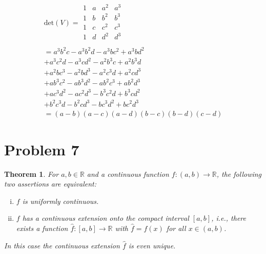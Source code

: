 \documentclass[]{article}
\newtheorem{theorem}{Theorem}
\begin{document}
\begin{align*}
	\textrm{det}(V) =
	\begin{array}{|cccc|}
		1 & a & a^2 & a^3 \\
		1 & b & b^2 & b^3 \\
		1 & c & c^2 & c^3 \\
		1 & d & d^2 & d^3 \\
	\end{array}
	\\ = a^{3} b^{2} c - a^{3} b^{2} d - a^{3} b c^{2} + a^{3} b d^{2} \\ + a^{3} c^{2} d - a^{3} c d^{2} - a^{2} b^{3} c + a^{2} b^{3} d \\ + a^{2} b c^{3} - a^{2} b d^{3} - a^{2} c^{3} d + a^{2} c d^{3} \\ + a b^{3} c^{2} - a b^{3} d^{2} - a b^{2} c^{3} + a b^{2} d^{3} \\ + a c^{3} d^{2} - a c^{2} d^{3} - b^{3} c^{2} d + b^{3} c d^{2} \\ + b^{2} c^{3} d - b^{2} c d^{3} - b c^{3} d^{2} + b c^{2} d^{3}
	\\ = \left(a - b\right) \left(a - c\right) \left(a - d\right) \left(b - c\right) \left(b - d\right) \left(c - d\right)
\end{align*}

\section*{Problem 7}

\begin{theorem}
	For $a,b \in \mathbb{R}$ and a continuous function $f : (a, b) \to \mathbb{R}$, the following two assertions are equivalent:
	
	\begin{enumerate}[(i)]
		\item $f$ is uniformly continuous.
		\item $f$ has a continuous extension onto the compact interval $[a,b]$, i.e., there exists a function $\hat{f} : [a, b] \to \mathbb{R}$ with $\hat{f}=f(x)$ for all $x \in (a, b)$.
	\end{enumerate}

	In this case the continuous extension $\hat{f}$ is even unique.
\end{theorem}
\end{document}
